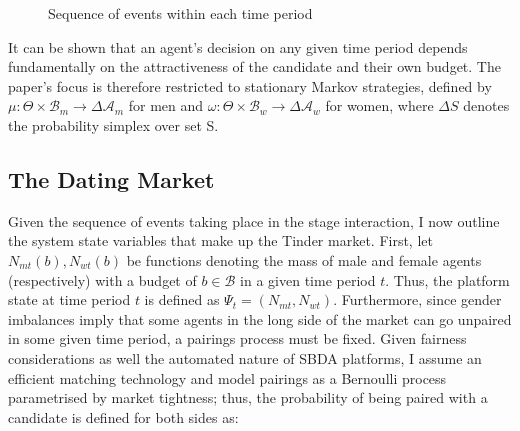 \begin{figure}[ht]
    \centering 
    \caption{Sequence of events within each time period}
    \vspace{20pt} 
    \label{fig:timeline}
\end{figure}

It can be shown that an agent’s decision on any given time period depends fundamentally on the attractiveness of the candidate and their own budget. The paper's focus is therefore restricted to stationary Markov strategies, defined by $\mu: \Theta \times\mathcal{B}_m\rightarrow \Delta\mathcal{A}_m$ for men and $\omega:\Theta \times\mathcal{B}_w\rightarrow \Delta\mathcal{A}_w$ for women, where $\Delta S$ denotes the probability simplex over set S. 

\subsection{The Dating Market}\label{sec:section2.2}
Given the sequence of events taking place in the stage interaction, I now outline the system state variables that make up the Tinder market. First, let $N_{mt}(b), N_{wt}(b)$ be functions denoting the mass of male and female agents (respectively) with a budget of $b\in\mathcal{B}$ in a given time period $t$. Thus, the platform state at time period $t$ is defined as $\Psi_t=(N_{mt},N_{wt})$. Furthermore, since gender imbalances imply that some agents in the long side of the market can go unpaired in some given time period, a pairings process must be fixed. Given fairness considerations as well the automated nature of SBDA platforms, I assume an efficient matching technology and model pairings as a Bernoulli process parametrised by market tightness; thus, the probability of being paired with a candidate is defined for both sides as:

